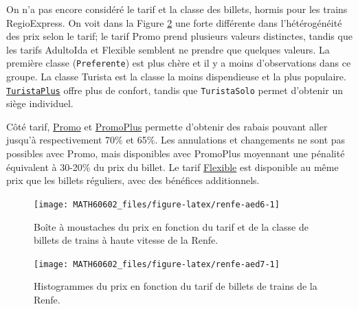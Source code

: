 \documentclass[
  11pt,
  letterpaper,
]{book}
\theoremstyle{definition}
\theoremstyle{definition}
\theoremstyle{definition}
\theoremstyle{definition}
\theoremstyle{remark}
\begin{document}
On n'a pas encore considéré le tarif et la classe des billets, hormis pour les trains RegioExpress. On voit dans la Figure \ref{fig:renfe-aed7} une forte différente dans l'hétérogénéité des prix selon le tarif; le tarif Promo prend plusieurs valeurs distinctes, tandis que les tarifs AdultoIda et Flexible semblent ne prendre que quelques valeurs. La première classe (\texttt{Preferente}) est plus chère et il y a moins d'observations dans ce groupe. La classe Turista est la classe la moins dispendieuse et la plus populaire. \href{http://web.archive.org/web/20161111134241/http://www.renfe.com/viajeros/tarifas/billete_promo.html}{\texttt{TuristaPlus}} offre plus de confort, tandis que \texttt{TuristaSolo} permet d'obtenir un siège individuel.

Côté tarif, \href{http://web.archive.org/web/20161111134241/http://www.renfe.com/viajeros/tarifas/billete_promo.html}{Promo} et \href{http://web.archive.org/web/20161110220249/http://www.renfe.com/viajeros/tarifas/billete_promoplus.html}{PromoPlus} permette d'obtenir des rabais pouvant aller jusqu'à respectivement 70\% et 65\%. Les annulations et changements ne sont pas possibles avec Promo, mais disponibles avec PromoPlus moyennant une pénalité équivalent à 30-20\% du prix du billet. Le tarif \href{http://web.archive.org/web/20161108192609/http://www.renfe.com/viajeros/tarifas/billete_flexible.html}{Flexible} est disponible au même prix que les billets réguliers, avec des bénéfices additionnels.

\begin{figure}

{\centering \texttt{[image: MATH60602\_files/figure-latex/renfe-aed6-1]} 

}

\caption{Boîte à moustaches du prix en fonction du tarif et de la classe de billets de trains à haute vitesse de la Renfe.}\label{fig:renfe-aed6}
\end{figure}

\begin{figure}

{\centering \texttt{[image: MATH60602\_files/figure-latex/renfe-aed7-1]} 

}

\caption{Histogrammes du prix en fonction du tarif de billets de trains de la Renfe.}\label{fig:renfe-aed7}
\end{figure}
\end{document}
